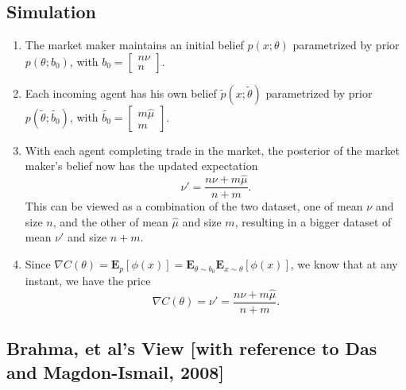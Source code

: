 \documentclass{article}
\begin{document}
\subsection*{Simulation}
\begin{enumerate}
    \item The market maker maintains an initial belief $p(x;\theta)$ parametrized by prior $p(\theta;b_0)$, with $b_0=\begin{bmatrix}
                  n\nu \\n
              \end{bmatrix}$.
    \item Each incoming agent has his own belief $\tilde{p}(x;\tilde{\theta})$ parametrized by prior $p(\tilde{\theta};\tilde{b_0})$, with $\tilde{b_0}=\begin{bmatrix}
                  m\hat{\mu} \\m
              \end{bmatrix}$.
    \item With each agent completing trade in the market, the posterior of the market maker's belief now has the updated expectation \[ \nu'=\frac{n\nu+m\hat{\mu}}{n+m}. \] This can be viewed as a combination of the two dataset, one of mean $\nu$ and size $n$, and the other of mean $\hat{\mu}$ and size $m$, resulting in a bigger dataset of mean $\nu'$ and size $n+m$.
    \item Since $\nabla C(\theta)=\mathbf{E}_{p}[\phi(x)]=\mathbf{E}_{\theta\sim b_0}\mathbf{E}_{x\sim\theta}[\phi(x)]$, we know that at any instant, we have the price $$\nabla C(\theta)=\nu'=\frac{n\nu+m\hat{\mu}}{n+m}.$$
\end{enumerate}
\subsection{Brahma, et al's View [with reference to Das and Magdon-Ismail, 2008]}
\end{document}
